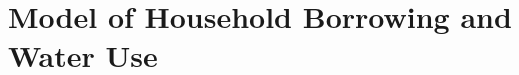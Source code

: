 \documentclass[12pt]{article}
\begin{document}

\section{Model of Household Borrowing and Water Use}

\end{document}
